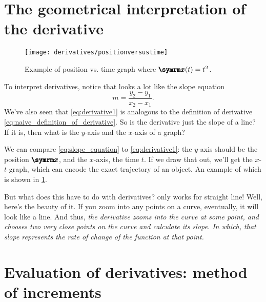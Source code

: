 \section{The geometrical interpretation of the derivative}

\begin{wrapfigure}[15]{l}{0.4\textwidth}
        \centering
        \texttt{[image: derivatives/positionversustime]}
        \caption{Example of position vs. time graph where $\protect\vv{x}(t) = t^2$.}
        \label{fig:position_versus_time}
\end{wrapfigure}

To interpret derivatives, notice that  looks a lot like the slope equation
\begin{equation}
    m = \frac{y_2 - y_1}{x_2 - x_1}. \label{eq:slope_equation}
\end{equation}
We've also seen that \cref{eq:derivative1} is analogous to the definition of derivative \cref{eq:naive_definition_of_derivative}. So is the derivative just the slope of a line? If it is, then what is the $y$-axis and the $x$-axis of a graph?

We can compare \cref{eq:slope_equation} to \cref{eq:derivative1}: the $y$-axis should be the position $\vv{x}$, and the $x$-axis, the time $t$. If we draw that out, we'll get the $x$-$t$ graph, which can encode the exact trajectory of an object. An example of which is shown in \cref{fig:position_versus_time}.

But what does this have to do with derivatives?  only works for straight line! Well, here's the beauty of it. If you zoom into any points on a curve, eventually, it will look like a line. And thus, \emph{the derivative zooms into the curve at some point, and chooses two very close points on the curve and calculate its slope. In which, that slope represents the rate of change of the function at that point.}

\section{Evaluation of derivatives: method of increments}

